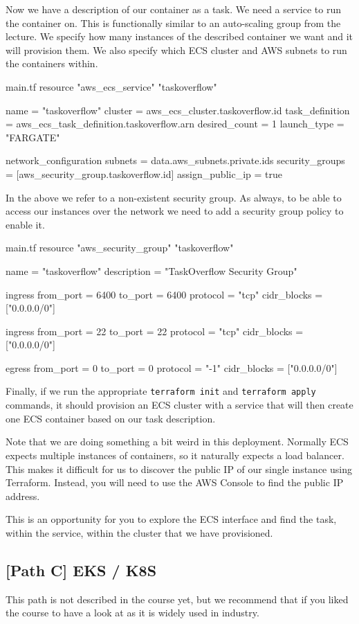 \documentclass{csse4400}
\begin{document}
Now we have a description of our container as a task.
We need a service to run the container on.
This is functionally similar to an auto-scaling group from the lecture.
We specify how many instances of the described container we want and it will provision them.
We also specify which ECS cluster and AWS subnets to run the containers within.

\begin{code}[language=terraform,numbers=none]{main.tf}
resource "aws_ecs_service" "taskoverflow" {
    name            = "taskoverflow"
    cluster         = aws_ecs_cluster.taskoverflow.id
    task_definition = aws_ecs_task_definition.taskoverflow.arn
    desired_count   = 1
    launch_type     = "FARGATE"
  
    network_configuration {
      subnets             = data.aws_subnets.private.ids
      security_groups     = [aws_security_group.taskoverflow.id]
      assign_public_ip    = true
    }
}
\end{code}

In the above we refer to a non-existent security group.
As always, to be able to access our instances over the network we need to add a security group policy to enable it.

\begin{code}[language=terraform,numbers=none]{main.tf}
resource "aws_security_group" "taskoverflow" {
    name = "taskoverflow"
    description = "TaskOverflow Security Group"
  
    ingress {
      from_port = 6400
      to_port = 6400
      protocol = "tcp"
      cidr_blocks = ["0.0.0.0/0"]
    }
  
    ingress {
      from_port = 22
      to_port = 22
      protocol = "tcp"
      cidr_blocks = ["0.0.0.0/0"]
    }
  
    egress {
      from_port = 0
      to_port = 0
      protocol = "-1"
      cidr_blocks = ["0.0.0.0/0"]
    }
}
\end{code}

Finally, if we run the appropriate \texttt{terraform init} and \texttt{terraform apply} commands,
it should provision an ECS cluster with a service that will then create one ECS container based on our task description.

Note that we are doing something a bit weird in this deployment.
Normally ECS expects multiple instances of containers,
so it naturally expects a load balancer.
This makes it difficult for us to discover the public IP of our single instance using Terraform.
Instead, you will need to use the AWS Console to find the public IP address.

This is an opportunity for you to explore the ECS interface and find the task, within the service, within the cluster that we have provisioned.

\subsection{[Path C] EKS / K8S}

This path is not described in the course yet,
but we recommend that if you liked the course to have a look at  as it is widely used in industry.



\end{document}
